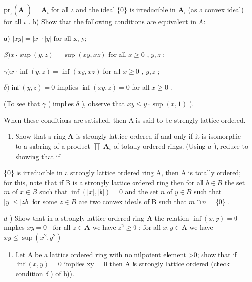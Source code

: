 \(\mathrm{pr}_{\iota}(\mathbf{A}^{\prime})=\mathbf{A}_{\iota}\) for all \(\iota\) and the ideal \(\{0\}\) is irreducible in \(\mathbf{A}_{\iota}\) (as a convex ideal) for all \(\iota\) . b) Show that the following conditions are equivalent in A:

α) \(|xy| = |x| \cdot |y|\) for all x, y;

\(\beta) x \cdot \sup(y, z) = \sup(xy, xz)\) for all \(x \geqslant 0\) , \(y, z\) ;

\(\gamma) x \cdot \inf(y, z) = \inf(xy, xz)\) for all \(x \geqslant 0\) , \(y, z\) ;

\(\delta)\inf (y,z) = 0\) implies \(\inf (xy,z) = 0\) for all \(x\geqslant 0\) .

(To see that \(\gamma\) ) implies \(\delta\) ), observe that \(xy \leqslant y \cdot \sup (x, 1)\) ).

When these conditions are satisfied, then A is said to be strongly lattice ordered.

\begin{enumerate}
\def\labelenumi{\alph{enumi})}
\setcounter{enumi}{2}
\tightlist
\item
  Show that a ring \(\mathbf{A}\) is strongly lattice ordered if and only if it is isomorphic to a subring of a product \(\prod_{i} \mathbf{A}_{i}\) of totally ordered rings. (Using \(a\) ), reduce to showing that if
\end{enumerate}

\{0\} is irreducible in a strongly lattice ordered ring A, then A is totally ordered; for this, note that if B is a strongly lattice ordered ring then for all \(b \in B\) the set \(m\) of \(x \in B\) such that \(\inf(|x|, |b|) = 0\) and the set \(n\) of \(y \in B\) such that \(|y| \leqslant |zb|\) for some \(z \in B\) are two convex ideals of B such that \(m \cap n = \{0\}\) .

\(d\) ) Show that in a strongly lattice ordered ring \(\mathbf{A}\) the relation \(\inf (x,y) = 0\) implies \(xy = 0\) ; for all \(z\in \mathbf{A}\) we have \(z^2\geqslant 0\) ; for all \(x,y\in \mathbf{A}\) we have \(xy\leqslant \sup (x^2,y^2)\)

\begin{enumerate}
\def\labelenumi{\alph{enumi})}
\setcounter{enumi}{4}
\tightlist
\item
  Let A be a lattice ordered ring with no nilpotent element \textgreater0; show that if \(\inf(x, y) = 0\) implies xy = 0 then A is strongly lattice ordered (check condition \(\delta\) ) of b)).
\end{enumerate}

